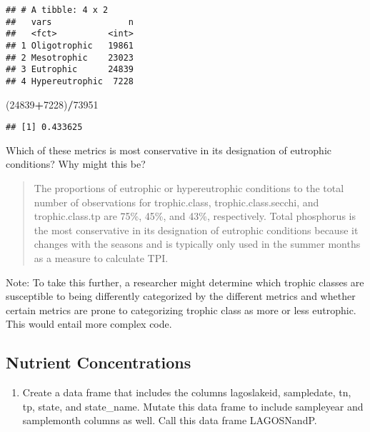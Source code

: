 \documentclass[]{article}
\newenvironment{Shaded}{\begin{snugshade}}{\end{snugshade}}
\newcommand{\DecValTok}[1]{\textcolor[rgb]{0.00,0.00,0.81}{#1}}
\newcommand{\NormalTok}[1]{#1}
\newcommand{\OperatorTok}[1]{\textcolor[rgb]{0.81,0.36,0.00}{\textbf{#1}}}
\providecommand{\tightlist}{%
  \setlength{\itemsep}{0pt}\setlength{\parskip}{0pt}}
\begin{document}
\begin{verbatim}
## # A tibble: 4 x 2
##   vars               n
##   <fct>          <int>
## 1 Oligotrophic   19861
## 2 Mesotrophic    23023
## 3 Eutrophic      24839
## 4 Hypereutrophic  7228
\end{verbatim}

\begin{Shaded}
\begin{Highlighting}[]
\NormalTok{(}\DecValTok{24839}\OperatorTok{+}\DecValTok{7228}\NormalTok{)}\OperatorTok{/}\DecValTok{73951}
\end{Highlighting}
\end{Shaded}

\begin{verbatim}
## [1] 0.433625
\end{verbatim}

Which of these metrics is most conservative in its designation of
eutrophic conditions? Why might this be?

\begin{quote}
The proportions of eutrophic or hypereutrophic conditions to the total
number of observations for trophic.class, trophic.class.secchi, and
trophic.class.tp are 75\%, 45\%, and 43\%, respectively. Total
phosphorus is the most conservative in its designation of eutrophic
conditions because it changes with the seasons and is typically only
used in the summer months as a measure to calculate TPI.
\end{quote}

Note: To take this further, a researcher might determine which trophic
classes are susceptible to being differently categorized by the
different metrics and whether certain metrics are prone to categorizing
trophic class as more or less eutrophic. This would entail more complex
code.

\hypertarget{nutrient-concentrations}{%
\subsection{Nutrient Concentrations}\label{nutrient-concentrations}}

\begin{enumerate}
\def\labelenumi{\arabic{enumi}.}
\setcounter{enumi}{7}
\tightlist
\item
  Create a data frame that includes the columns lagoslakeid, sampledate,
  tn, tp, state, and state\_name. Mutate this data frame to include
  sampleyear and samplemonth columns as well. Call this data frame
  LAGOSNandP.
\end{enumerate}
\end{document}
